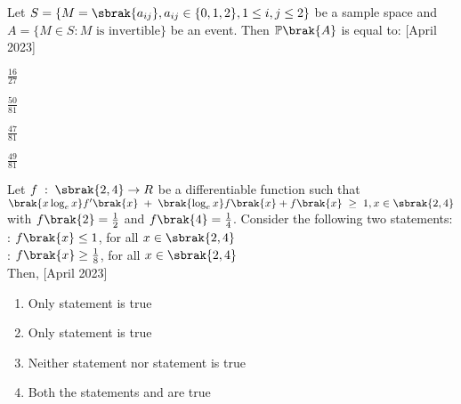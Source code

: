         \bigskip
    \item Let $S=\{M=\sbrak{a_{ij}},a_{ij} \in \{0,1,2\},1 \le i,j \le 2\}$ be a sample space and $A=\{M \in S : M\text{ is invertible}\}$ be an event. Then $\mathbb{P}\brak{A}$ is equal to: \hfill{[April 2023]}
    \begin{enumerate}
        \begin{multicols}{4}
            \item $\frac{16}{27}$
            \item $\frac{50}{81}$
            \item $\frac{47}{81}$
            \item $\frac{49}{81}$
        \end{multicols}
        \end{enumerate}
\bigskip
 
 \item Let $f\;:\;\sbrak{2,4} \rightarrow R$ be a differentiable function such that $\brak{x\log_{e}{x}}f'\brak{x}\;+\;\brak{\log_{e}{x}}f\brak{x}+f\brak{x}\; \ge \; 1, x\in \sbrak{2,4} $ with $f\brak{2}=\frac{1}{2}$ and $f\brak{4}=\frac{1}{4}$. Consider the following two statements: \\
  : $f\brak{x}\le 1$, for all $x \in \sbrak{2,4}$ \\
  : $f\brak{x}\ge \frac{1}{8}$, for all $x \in \sbrak{2,4}$\\
 Then, \hfill{[April 2023]}
 \begin{enumerate}
     \item Only statement  is true
     \item Only statement  is true 
     \item Neither statement  nor statement  is true
     \item Both the statements  and  are true 
 \end{enumerate}
 
